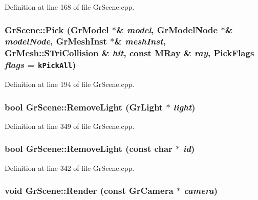Definition at line 168 of file GrScene.cpp.\hypertarget{class_gr_scene_55ff6809eccf8aee6efbe9093902e241}{
\subsubsection[{Pick}]{ GrScene::Pick ({\bf GrModel} $\ast$\& {\em model}, \/  {\bf GrModelNode} $\ast$\& {\em modelNode}, \/  {\bf GrMeshInst} $\ast$\& {\em meshInst}, \/  {\bf GrMesh::STriCollision} \& {\em hit}, \/  const {\bf MRay} \& {\em ray}, \/  {\bf PickFlags} {\em flags} = {\tt {\bf kPickAll}})}}
\label{class_gr_scene_55ff6809eccf8aee6efbe9093902e241}




Definition at line 194 of file GrScene.cpp.\hypertarget{class_gr_scene_56a9545a1667c9dae82eecb89c4a60d7}{
\subsubsection[{RemoveLight}]{\setlength{\rightskip}{0pt plus 5cm}bool GrScene::RemoveLight ({\bf GrLight} $\ast$ {\em light})}}
\label{class_gr_scene_56a9545a1667c9dae82eecb89c4a60d7}




Definition at line 349 of file GrScene.cpp.\hypertarget{class_gr_scene_d164195244a057f9a27808fed5e49a97}{
\subsubsection[{RemoveLight}]{\setlength{\rightskip}{0pt plus 5cm}bool GrScene::RemoveLight (const char $\ast$ {\em id})}}
\label{class_gr_scene_d164195244a057f9a27808fed5e49a97}




Definition at line 342 of file GrScene.cpp.\hypertarget{class_gr_scene_881037f45a998cb19df5256943f9b50f}{
\subsubsection[{Render}]{\setlength{\rightskip}{0pt plus 5cm}void GrScene::Render (const {\bf GrCamera} $\ast$ {\em camera})}}
\label{class_gr_scene_881037f45a998cb19df5256943f9b50f}




